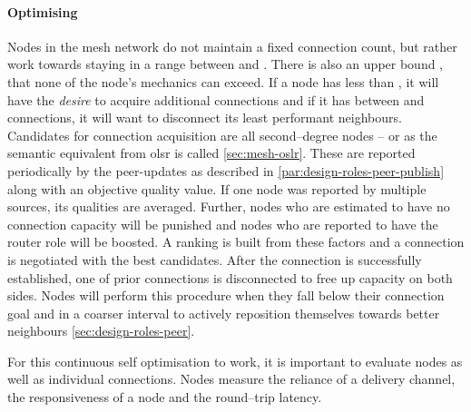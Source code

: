 \paragraph{Optimising}

Nodes in the mesh network do not maintain a fixed connection count, but rather work towards staying in a range between \minConnectionGoal and \maxConnectionGoal. There is also an upper bound \maxConnections, that none of the node's mechanics can exceed. If a node has less than \minConnectionGoal, it will have the \textit{desire} to acquire additional connections and if it has between \maxConnectionGoal and \maxConnections connections, it will want to disconnect its least performant neighbours. Candidates for connection acquisition are all second–degree nodes – or  as the semantic equivalent from \gls{olsr} is called \cref{sec:mesh-oslr}. These are reported periodically by the \glspl{peer-update} as described in \ref{par:design-roles-peer-publish} along with an objective quality value. If one node was reported by multiple sources, its qualities are averaged. Further, nodes who are estimated to have no connection capacity will be punished and nodes who are reported to have the router role will be boosted. A ranking is built from these factors and a connection is negotiated with the best candidates. After the connection is successfully established, one of prior connections is disconnected to free up capacity on both sides.
Nodes will perform this procedure when they fall below their connection goal \minConnectionGoal and in a coarser interval to actively reposition themselves towards better neighbours \cref{sec:design-roles-peer}.

For this continuous self optimisation to work, it is important to evaluate nodes as well as individual connections. Nodes measure the reliance of a delivery channel, the responsiveness of a node and the round–trip latency.
